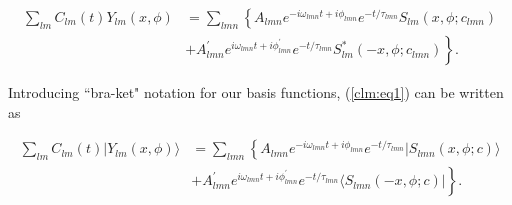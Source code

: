\documentclass[10pt]{article}
\newcommand{\bra}[1]{\langle #1|}
\newcommand{\ket}[1]{|#1\rangle}
\begin{document}
\begin{equation} \label{clm:eq1}
\begin{aligned}
\sum_{lm} C_{lm}(t) Y_{lm}(x, \phi) & = \sum_{lmn} \left \{ A_{lmn} e^{-i\omega_{lmn}t+i\phi_{lmn}}e^{-t/\tau_{lmn}} S_{lm}(x, \phi ;c_{lmn}) \right. \\
& \left. + A^{'}_{lmn} e^{i\omega_{lmn}t+i\phi^{'}_{lmn}}e^{-t/\tau_{lmn}} S^{*}_{lm}(-x, \phi; c_{lmn}) \right \}.
\end{aligned}
\end{equation}

\noindent
Introducing ``bra-ket" notation for our basis functions, (\ref{clm:eq1}) can be written as  

\begin{equation} \label{clm:eq2}
\begin{aligned}
\sum_{lm} C_{lm}(t) \ket{Y_{lm}(x, \phi)} & = \sum_{lmn} \left \{ A_{lmn} e^{-i\omega_{lmn}t+i\phi_{lmn}}e^{-t/\tau_{lmn}} \ket{S_{lmn}(x, \phi ;c)} \right. \\
& \left. + A^{'}_{lmn} e^{i\omega_{lmn}t+i\phi^{'}_{lmn}}e^{-t/\tau_{lmn}} \bra{S_{lmn}(-x, \phi; c)} \right \}.
\end{aligned}
\end{equation}
\end{document}
